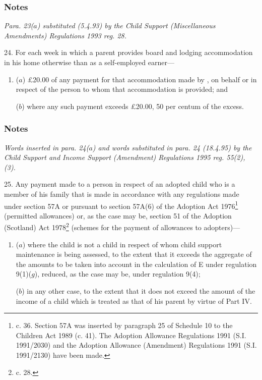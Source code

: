 \documentclass[a4paper]{article}
\newcommand\amendment[1]{\subsubsection*{Notes}{\itshape\frenchspacing\footnotesize #1 \par\goodbreak}}
\begin{document}
\amendment{
Para. 23($a$) substituted (5.4.93) by the Child Support (Miscellaneous Amendments) Regulations 1993 reg. 28.
}

\medskip

24.  
For each week in which a parent provides  %
board and lodging accommodation in his home otherwise than as a self-employed earner—
\begin{enumerate}\item[]
($a$) £20.00 of any payment for that accommodation made by%
, on behalf or in respect of  %
the person to whom that accommodation is provided; and

($b$) where any such payment exceeds £20.00, 50 per centum of the excess.
\end{enumerate}

\amendment{
Words inserted in para. 24($a$) and words substituted in para. 24 (18.4.95) by the Child Support and Income Support (Amendment) Regulations 1995 reg. 55(2), (3).
}

\medskip

25.  Any payment made to a person in respect of an adopted child who is a member of his family that is made in accordance with any regulations made under section 57A or pursuant to section 57A(6) of the Adoption Act 1976\footnote{ c. 36. Section 57A was inserted by paragraph 25 of Schedule 10 to the Children Act 1989 (c. 41). The Adoption Allowance Regulations 1991 (S.I. 1991/2030) and the Adoption Allowance (Amendment) Regulations 1991 (S.I. 1991/2130) have been made.} (permitted allowances) or, as the case may be, section 51 of the Adoption (Scotland) Act 1978\footnote{ c. 28.} (schemes for the payment of allowances to adopters)—
\begin{enumerate}\item[]
($a$) where the child is not a child in respect of whom child support maintenance is being assessed, to the extent that it exceeds 
the aggregate of the amounts to be taken into account in the calculation of E under regulation 9(1)($g$), %
reduced, as the case may be, under regulation 9(4);

($b$) in any other case, to the extent that it does not exceed the amount of the income of a child which is treated as that of his parent by virtue of Part IV.
\end{enumerate}
\end{document}
